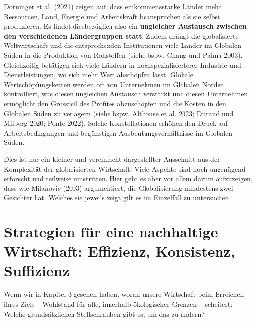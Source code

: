 \documentclass[
  nswissgerman,
  a4paper,
  DIV=11,
  numbers=noendperiod,
  oneside,
  openany]{scrreprt}
\begin{document}
Dorninger et al. (2021) zeigen auf, dass einkommensstarke Länder mehr
Ressourcen, Land, Energie und Arbeitskraft beanspruchen als sie selbst
produzieren. Es findet diesbezüglich also ein \textbf{ungleicher
Austausch zwischen den verschiedenen Ländergruppen statt}. Zudem drängt
die globalisierte Weltwirtschaft und die entsprechenden Institutionen
viele Länder im Globalen Süden in die Produktion von Rohstoffen (siehe
bspw. Chang und Palma 2003). Gleichzeitig betätigen sich viele Ländern
in hochspezialisierterer Industrie und Dienstleistungen, wo sich mehr
Wert abschöpfen lässt. Globale Wertschöpfungsketten werden oft von
Unternehmen im Globalen Norden kontrolliert, was diesen ungleichen
Austausch verstärkt und diesen Unternehmen ermöglicht den Grossteil des
Profites abzuschöpfen und die Kosten in den Globalen Süden zu verlagern
(siehe bspw. Althouse et al. 2023; Durand und Milberg 2020; Ponte 2022).
Solche Konstellationen erhöhen den Druck auf Arbeitsbedingungen und
begünstigen Ausbeutungsverhältnisse im Globalen Süden.

Dies ist nur ein kleiner und vereinfacht dargestellter Ausschnitt aus
der Komplexität der globalisierten Wirtschaft. Viele Aspekte sind noch
ungenügend erforscht und teilweise umstritten. Hier geht es aber vor
allem darum aufzuzeigen, dass wie Milanovic (2003) argumentiert, die
Globalisierung mindestens zwei Gesichter hat. Welches sie jeweils zeigt
gilt es im Einzelfall zu untersuchen.

\chapter{Strategien für eine nachhaltige Wirtschaft: Effizienz,
Konsistenz,
Suffizienz}\label{strategien-fuxfcr-eine-nachhaltige-wirtschaft-effizienz-konsistenz-suffizienz}

\begin{tcolorbox}[enhanced jigsaw, arc=.35mm, bottomrule=.15mm, bottomtitle=1mm, breakable, colback=white, colbacktitle=quarto-callout-note-color!10!white, colframe=quarto-callout-note-color-frame, coltitle=black, left=2mm, leftrule=.75mm, opacityback=0, opacitybacktitle=0.6, rightrule=.15mm, title={Leitfrage}, titlerule=0mm, toprule=.15mm, toptitle=1mm]

Wenn wir in Kapitel 3 gesehen haben, woran unsere Wirtschaft beim
Erreichen ihres Ziels -- Wohlstand für alle, innerhalb ökologischer
Grenzen -- scheitert: Welche grundsätzlichen Stellschrauben gibt es, um
das zu ändern?

\end{tcolorbox}
\end{document}
